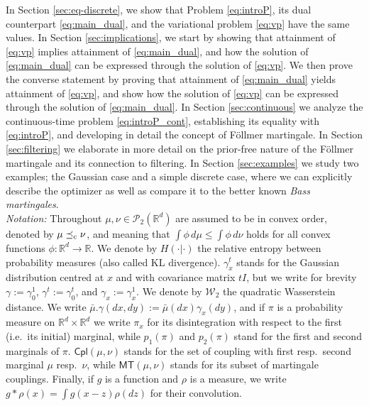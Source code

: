 \documentclass[reqno, a4paper]{amsart}
\theoremstyle{plain}
\theoremstyle{definition}
\theoremstyle{remark}
\numberwithin{equation}{section}
\numberwithin{theorem}{section}
\newcommand{\R}{\mathbb{R}}
\newcommand{\Rd}{\mathbb{R}^{d}}
\newcommand{\MT}{\mathsf{MT}}
\newcommand{\Cpl}{\mathsf{Cpl}}
\newcommand{\lc}{\preceq_{\textnormal{c}}}
\newcommand{\PP}{\mathcal{P}}
\begin{document}
	In Section \ref{sec:eq-discrete}, we show that Problem \eqref{eq:introP}, its dual counterpart \eqref{eq:main_dual}, and the variational problem \eqref{eq:vp} have the same values. 
	In Section \ref{sec:implications}, we start by showing that attainment of \eqref{eq:vp} implies attainment of \eqref{eq:main_dual}, and how the solution of \eqref{eq:main_dual} can be expressed through the solution of \eqref{eq:vp}. We then prove the converse statement by proving that attainment of \eqref{eq:main_dual} yields attainment of \eqref{eq:vp}, and show how the solution of \eqref{eq:vp} can be expressed through the solution of \eqref{eq:main_dual}.
	In Section \ref{sec:continuous} we analyze the continuous-time problem \eqref{eq:introP_cont}, establishing its equality with \eqref{eq:introP}, and developing in detail the concept of Föllmer martingale.
	In Section \ref{sec:filtering} we elaborate in more detail on the prior-free nature of the Föllmer martingale and its connection to filtering.
	In Section \ref{sec:examples} we study two examples; the Gaussian case and a simple discrete case, where we can explicitly describe the optimizer as well as compare it to the better known \emph{Bass martingales}.\\
	
	
	
	
	\emph{Notation:} Throughout $\mu,\nu\in \PP_{2}(\Rd) $ are assumed to be in convex order, denoted by $\mu \lc \nu$, and meaning that $\int \phi \, d\mu \leqslant \int \phi \, d\nu$ holds for all convex functions $\phi \colon \Rd \rightarrow \R$. We denote by $H(\cdot|\cdot)$ the relative entropy between probability measures (also called KL divergence). $\gamma_x^t$ stands for the Gaussian distribution centred at $x$ and with covariance matrix $tI$, but we write for brevity $\gamma:=\gamma_0^1$, $\gamma^t:=\gamma_0^t$, and $\gamma_x:=\gamma_x^1$. We denote by $\mathcal W_2$ the quadratic Wasserstein distance. We write $\bar\mu.\gamma(dx,dy):=\bar\mu(dx)\gamma_x(dy)$, and if $\pi$ is a probability measure on $\Rd\times\Rd$ we write $\pi_x$ for its disintegration with respect to the first (i.e.\, its initial) marginal, while $p_1(\pi)$ and $p_2(\pi)$ stand for the first and second marginals of $\pi$. $\Cpl(\mu,\nu)$ stands for the set of coupling with first resp.\ second marginal $\mu$ resp.\ $\nu$, while $\MT(\mu,\nu)$ stands for its subset of martingale couplings. Finally, if $g$ is a function and $\rho$ is a measure, we write $g\ast \rho(x)=\int g(x-z)\rho(dz)$ for their convolution.\\
	
\end{document}
